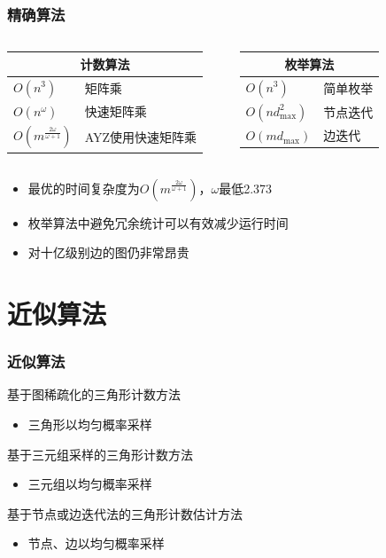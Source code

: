 \documentclass{beamer}
\begin{document}
\begin{frame}
\frametitle{精确算法}
\begin{columns}
\begin{table}
    \begin{tabular}{ll} 
           \multicolumn{2}{c}{\textbf{计数算法}} \\
           \midrule   
            $O(n^3)$&矩阵乘\\
            $O(n^\omega)$&快速矩阵乘\\
            $O(m^\frac{2\omega}{\omega +1})$&AYZ使用快速矩阵乘\\
    \end{tabular}
\end{table}
\begin{table}
    \begin{tabular}{ll} 
           \multicolumn{2}{c}{\textbf{枚举算法}} \\
           \midrule   
            $O(n^3)$ & 简单枚举\\
            $O(nd_{\max}^2)$ & 节点迭代\\
            $O(md_{\max})$&边迭代\\
    \end{tabular}
\end{table}
\end{columns}
\begin{itemize}
    \item 最优的时间复杂度为$O( m^{\frac{2\omega}{\omega +1}})$，$\omega$最低2.373\cite{le2014powers}
    \item 枚举算法中避免冗余统计可以有效减少运行时间\cite{schank2005finding, latapy2008main}
    \item 对十亿级别边的图仍非常昂贵
\end{itemize}
\end{frame}

\section{近似算法}
\begin{frame}
\frametitle{近似算法} 

基于图稀疏化的三角形计数方法
    \begin{itemize}
    \item 三角形以均匀概率采样 
    \end{itemize}

基于三元组采样的三角形计数方法
    \begin{itemize}
    \item 三元组以均匀概率采样
    \end{itemize}

基于节点或边迭代法的三角形计数估计方法
    \begin{itemize}
    \item 节点、边以均匀概率采样
    \end{itemize}
\end{frame}
\end{document}
